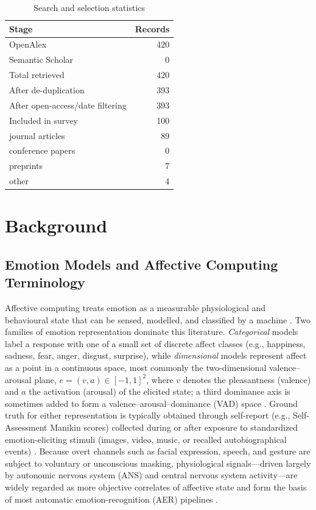 \begin{table}[!t]
\centering
\caption{Search and selection statistics}\label{tab:prisma}
\begin{tabular}{@{}lr@{}}
\toprule
\textbf{Stage} & \textbf{Records} \\
\midrule
OpenAlex & 420 \\
Semantic Scholar & 0 \\
\midrule
Total retrieved & 420 \\
After de-duplication & 393 \\
After open-access/date filtering & 393 \\
Included in survey & 100 \\
\midrule
\quad journal articles & 89 \\
\quad conference papers & 0 \\
\quad preprints & 7 \\
\quad other & 4 \\
\bottomrule
\end{tabular}
\end{table}

\section{Background}\label{sec:background}
\subsection{Emotion Models and Affective Computing Terminology}
Affective computing treats emotion as a measurable physiological and behavioural state that can be sensed, modelled, and classified by a machine \cite{khare2023emotion,houssein2022human}. Two families of emotion representation dominate this literature. \emph{Categorical} models label a response with one of a small set of discrete affect classes (e.g., happiness, sadness, fear, anger, disgust, surprise), while \emph{dimensional} models represent affect as a point in a continuous space, most commonly the two-dimensional valence--arousal plane, $e = (v, a) \in [-1,1]^2$, where $v$ denotes the pleasantness (valence) and $a$ the activation (arousal) of the elicited state; a third dominance axis is sometimes added to form a valence--arousal--dominance (VAD) space \cite{khare2023emotion,younis2024machine,saganowski2022emotion}. Ground truth for either representation is typically obtained through self-report (e.g., Self-Assessment Manikin scores) collected during or after exposure to standardized emotion-eliciting stimuli (images, video, music, or recalled autobiographical events) \cite{shu2018review,saganowski2022emotion}. Because overt channels such as facial expression, speech, and gesture are subject to voluntary or unconscious masking, physiological signals---driven largely by autonomic nervous system (ANS) and central nervous system activity---are widely regarded as more objective correlates of affective state and form the basis of most automatic emotion-recognition (AER) pipelines \cite{houssein2022human,egger2019emotion,khare2023emotion}.

